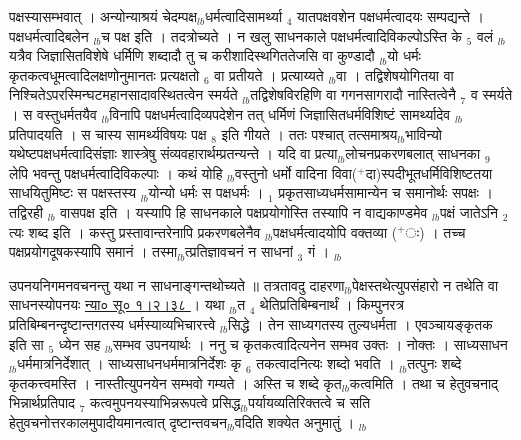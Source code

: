 \documentclass[article,12pt,a4paper]{memoir}%
\newcommand{\add}[1]{($^{+}$#1)}
\newcounter{parCount}
\begin{document}
पक्षस्यासम्भवात् । अन्योन्याश्रयं चेदम्पक्ष{\tiny $_{lb}$}धर्मत्वादिसामर्थ्या {\tiny $_{4}$} यातपक्षवशेन पक्षधर्मत्वादयः सम्पद्यन्ते । पक्षधर्मत्वादिबलेन {\tiny $_{lb}$}च पक्ष इति । तदत्रोच्यते । न खलु साधनकाले पक्षधर्मत्वादिविकल्पोऽस्ति के {\tiny $_{5}$} वलं {\tiny $_{lb}$}यत्रैव जिज्ञासितविशेषे धर्मिणि शब्दादौ तु च करीशादिस्थगिततेजसि वा कुण्डादौ {\tiny $_{lb}$}यो धर्मः कृतकत्वधूमत्वादिलक्षणोनुमानतः प्रत्यक्षतो {\tiny $_{6}$} वा प्रतीयते । प्रत्याय्यते {\tiny $_{lb}$}वा । तद्विशेषयोगितया वा निश्चितेऽपरस्मिन्घटमहानसादावस्थितत्वेन स्मर्यते {\tiny $_{lb}$}तद्विशेषविरहिणि वा गगनसागरादौ नास्तित्वेनै {\tiny $_{7}$} व स्मर्यते । स वस्तुधर्मतयैव {\tiny $_{lb}$}विनापि पक्षधर्मत्वादिव्यपदेशेन तत् धर्मिणं जिज्ञासितधर्मविशिष्टं सामर्थ्यादेव {\tiny $_{lb}$}प्रतिपादयति । स चास्य सामर्थ्यविषयः पक्ष {\tiny $_{8}$} इति गीयते । ततः पश्चात् तत्समाश्रय{\tiny $_{lb}$}भाविन्यो यथेष्टपक्षधर्मत्वादिसंज्ञाः शास्त्रेषु संव्यवहारार्थम्प्रतन्यन्ते । यदि वा प्रत्या{\tiny $_{lb}$}लोचनप्रकरणबलात् साधनका {\tiny $_{9}$} \leavevmode{} लेपि भवन्तु पक्षधर्मत्वादिविकल्पाः । कथं योहि {\tiny $_{lb}$}वस्तुनो धर्मो वादिना विवा\add{दा}स्पदीभूतधर्मिविशिष्टतया साधयितुमिष्टः स पक्षस्तस्य {\tiny $_{lb}$}योन्यो धर्मः स पक्षधर्मः । {\tiny $_{1}$} प्रकृतसाध्यधर्मसामान्येन च समानोर्थः सपक्षः । तद्विरही {\tiny $_{lb}$} \leavevmode{} वासपक्ष इति । यस्यापि हि साधनकाले पक्षप्रयोगोस्ति तस्यापि न वाद्यकाण्डमेव {\tiny $_{lb}$}पक्षं जातेऽनि {\tiny $_{2}$} त्यः शब्द इति । कस्तु प्रस्तावान्तरेनापि प्रकरणबलेनैव {\tiny $_{lb}$}पक्षधर्मत्वादयोपि वक्तव्या \add{ः} । तच्च पक्षप्रयोगदूषकस्यापि समानं । तस्मा{\tiny $_{lb}$}त्प्रतिज्ञावचनं न साधनां {\tiny $_{3}$} गं ।
	{}
	\pend%
      {\tiny $_{lb}$}

	  
	  \pstart \leavevmode%
	\hphantom{.}उपनयनिगमनवचनन्तु यथा न साधनाङ्गन्तथोच्यते ॥ तत्रतावदु दाहरणा{\tiny $_{lb}$}पेक्षस्तथेत्युपसंहारो न तथेति वा साधनस्योपनयः \href{http://sarit.indology.info/?cref=ns\%C5\%AB.1.2.38}{न्या० सू०  १।२।३८ } । यथा {\tiny $_{lb}$}त {\tiny $_{4}$} थेतिप्रतिबिम्बनार्थं । किम्पुनरत्र प्रतिबिम्बनन्दृष्टान्तगतस्य धर्मस्याव्यभिचारत्त्वे {\tiny $_{lb}$}सिद्धे । तेन साध्यगतस्य तुल्यधर्मता । एवञ्चायङ्कृतक इति सा {\tiny $_{5}$} ध्येन सह {\tiny $_{lb}$}सम्भव उपनयार्थः । ननु च कृतकत्वादित्यनेन सम्भव उक्तः । नोक्तः । साध्यसाधन{\tiny $_{lb}$}धर्ममात्रनिर्देशात् । साध्यसाधनधर्ममात्रनिर्देशः कृ {\tiny $_{6}$} तकत्वादनित्यः शब्दो भवति । {\tiny $_{lb}$}तत्पुनः शब्दे कृतकत्त्वमस्ति । नास्तीत्युपनयेन सम्भवो गम्यते । अस्ति च शब्दे कृत{\tiny $_{lb}$}कत्वमिति । तथा च हेतुवचनाद् भिन्नार्थप्रतिपाद {\tiny $_{7}$} कत्वमुपनयस्याभिन्नरूपत्वे प्रसिद्ध{\tiny $_{lb}$}पर्यायव्यतिरिक्तत्वे च सति हेतुवचनोत्तरकालमुपादीयमानत्वात् दृष्टान्तवचन{\tiny $_{lb}$}वदिति शक्येत अनुमातुं ।
	{}
	\pend%
      {\tiny $_{lb}$}
\end{document}

